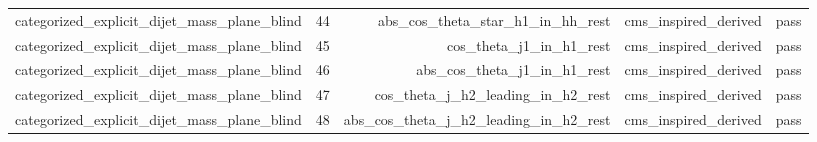 \begin{table}[htbp]
\begin{tabular}{lrrrr}
categorized\_explicit\_dijet\_mass\_plane\_blind & 44 & abs\_cos\_theta\_star\_h1\_in\_hh\_rest & cms\_inspired\_derived & pass \\
categorized\_explicit\_dijet\_mass\_plane\_blind & 45 & cos\_theta\_j1\_in\_h1\_rest & cms\_inspired\_derived & pass \\
categorized\_explicit\_dijet\_mass\_plane\_blind & 46 & abs\_cos\_theta\_j1\_in\_h1\_rest & cms\_inspired\_derived & pass \\
categorized\_explicit\_dijet\_mass\_plane\_blind & 47 & cos\_theta\_j\_h2\_leading\_in\_h2\_rest & cms\_inspired\_derived & pass \\
categorized\_explicit\_dijet\_mass\_plane\_blind & 48 & abs\_cos\_theta\_j\_h2\_leading\_in\_h2\_rest & cms\_inspired\_derived & pass \\
\bottomrule
\end{tabular}
\end{table}
